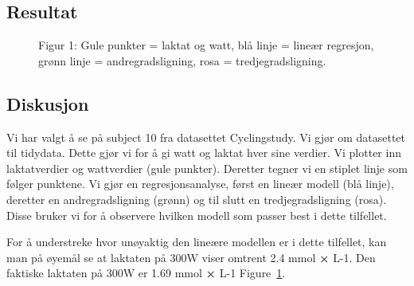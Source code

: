 \documentclass[
  letterpaper,
  DIV=11,
  numbers=noendperiod]{scrreprt}
\begin{document}
\subsection{Resultat}\label{resultat-1}

\begin{figure}


\caption{\label{fig-fig1}Figur 1: Gule punkter = laktat og watt, blå
linje = lineær regresjon, grønn linje = andregradsligning, rosa =
tredjegradsligning.}

\end{figure}%

\subsection{Diskusjon}\label{diskusjon-1}

Vi har valgt å se på subject 10 fra datasettet Cyclingstudy. Vi gjør om
datasettet til tidydata. Dette gjør vi for å gi watt og laktat hver sine
verdier. Vi plotter inn laktatverdier og wattverdier (gule punkter).
Deretter tegner vi en stiplet linje som følger punktene. Vi gjør en
regresjonsanalyse, først en lineær modell (blå linje), deretter en
andregradsligning (grønn) og til slutt en tredjegradsligning (rosa).
Disse bruker vi for å observere hvilken modell som passer best i dette
tilfellet.

For å understreke hvor unøyaktig den lineære modellen er i dette
tilfellet, kan man på øyemål se at laktaten på 300W viser omtrent 2.4
mmol \textbf{×} L-1. Den faktiske laktaten på 300W er 1.69 mmol
\textbf{×} L-1 Figure~\ref{fig-fig1}.
\end{document}
